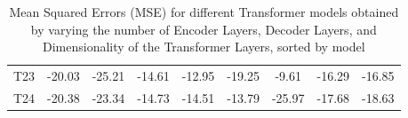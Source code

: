 \begin{table}[]
{\begin{tabular}{ccccccccc}
    T23   & \cellcolor[HTML]{FFDD82}-20.03 & \cellcolor[HTML]{FDB97B}-25.21 & \cellcolor[HTML]{D6DF81}-14.61 & \cellcolor[HTML]{FB9674}-12.95 & \cellcolor[HTML]{8CC97D}-19.25 & \cellcolor[HTML]{FA8671}-9.61  & \cellcolor[HTML]{FCAA78}-16.29 & \cellcolor[HTML]{FCAC78}-16.85 \\
    T24   & \cellcolor[HTML]{FFEA84}-20.38 & \cellcolor[HTML]{FB9C75}-23.34 & \cellcolor[HTML]{C7DB80}-14.73 & \cellcolor[HTML]{FCA978}-14.51 & \cellcolor[HTML]{F5E883}-13.79 & \cellcolor[HTML]{63BE7B}-25.97 & \cellcolor[HTML]{FFDA81}-17.68 & \cellcolor[HTML]{FFE283}-18.63
    \end{tabular}%
    }
    \caption{Mean Squared Errors (MSE) for different Transformer models obtained by varying the number of Encoder Layers, Decoder Layers, and Dimensionality of the Transformer Layers, sorted by model}
    \label{T4_M}
    \end{table}

